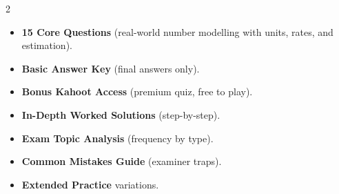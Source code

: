 \documentclass[11pt,a4paper]{article}
\newcommand{\FullReleaseDate}{April 30, 2026}
\begin{document}
\vspace{8pt}

\begin{multicols}{2}
  \begin{tcolorbox}[card, title=\sffamily\bfseries\textcolor{white}{\faHandPointDown\ TODAY (Simplified Version)}, colbacktitle=mainblue, boxed title style={sharp corners, boxrule=0pt}]
    \begin{itemize}[leftmargin=1.2em, itemsep=2pt]
      \item \small \textbf{15 Core Questions} (real-world number modelling with units, rates, and estimation).
      \item \small \textbf{Basic Answer Key} (final answers only).
      \item \small \textbf{Bonus Kahoot Access} (premium quiz, free to play).
    \end{itemize}
  \end{tcolorbox}

  \columnbreak

  \begin{tcolorbox}[card, title=\sffamily\bfseries\textcolor{white}{\faRocket\ ON \FullReleaseDate\ (Full Upgrade)}, colbacktitle=mainblue, boxed title style={sharp corners, boxrule=0pt}]
    \begin{itemize}[leftmargin=1.2em, itemsep=2pt]
      \item \small \textbf{In-Depth Worked Solutions} (step-by-step).
      \item \small \textbf{Exam Topic Analysis} (frequency by type).
      \item \small \textbf{Common Mistakes Guide} (examiner traps).
      \item \small \textbf{Extended Practice} variations.
    \end{itemize}
  \end{tcolorbox}
\end{multicols}
\end{document}
